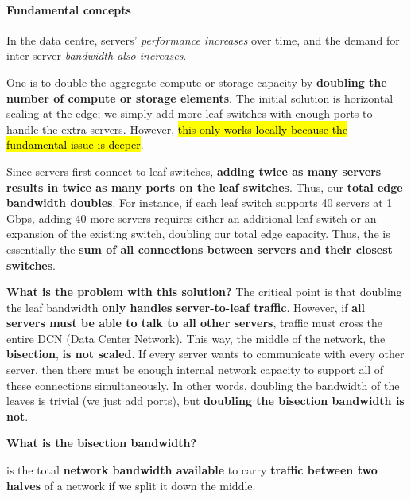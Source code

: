 \paragraph{Fundamental concepts}

In the data centre, servers' \emph{performance increases} over time, and the demand for inter-server \emph{bandwidth also increases}.

\highspace
One  is to double the aggregate compute or storage capacity by \textbf{doubling the number of compute or storage elements}. The initial solution is horizontal scaling at the edge; we simply add more leaf switches with enough ports to handle the extra servers. However, \hl{this only works locally because the fundamental issue is deeper}.

\highspace
Since servers first connect to leaf switches, \textbf{adding twice as many servers results in twice as many ports on the leaf switches}. Thus, our \textbf{total edge bandwidth doubles}. For instance, if each leaf switch supports 40 servers at 1 Gbps, adding 40 more servers requires either an additional leaf switch or an expansion of the existing switch, doubling our total edge capacity. Thus, the  is essentially the \textbf{sum of all connections between servers and their closest switches}.

\highspace
\textcolor{Red2}{ \textbf{What is the problem with this \naive solution?}} The critical point is that doubling the leaf bandwidth \textbf{only handles server-to-leaf traffic}. However, if \textbf{all servers must be able to talk to all other servers}, traffic must cross the entire DCN (Data Center Network). This way, the middle of the network, the \textbf{bisection}, \textbf{is not scaled}. If every server wants to communicate with every other server, then there must be enough internal network capacity to support all of these connections simultaneously. In other words, doubling the bandwidth of the leaves is trivial (we just add ports), but \textbf{doubling the bisection bandwidth is not}.

\highspace
\begin{flushleft}
    \textcolor{Green3}{ \textbf{What is the bisection bandwidth?}}
\end{flushleft}
 is the total \textbf{network bandwidth available} to carry \textbf{traffic between two halves} of a network if we split it down the middle.

